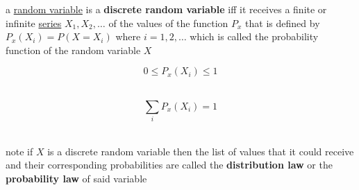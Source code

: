 \documentclass[a4paper,12pt]{article}
\newcommand{\?}{\stackrel{?}{=}}
\begin{document}
\newenvironment{note}
  {\begin{bclogo}[logo=\bcinfo, couleurBarre=orange, couleur=lightgray]{ note}}
  {\end{bclogo}}
\newenvironment{attention}
  {\begin{bclogo}[logo=\bcattention, couleurBarre=red, noborder=true, 
                couleur=red!15]{Important!}}
  {\end{bclogo}}

\begin{definition}
a \href{20230104221353-random_variable.org}{random variable} is a \textbf{discrete random variable} iff it receives a finite or infinite \href{calculus2.org}{series} \(X_1,X_2,\dots\) of the values of the function \(P_x\) that is defined by \(P_x(X_i)=P(X=X_i)\) where \(i=1,2,\dots\) which is called the probability function of the random variable \(X\)\\[0pt]
\end{definition}
\begin{characteristic}
\[
0 \le P_x(X_i) \le 1
\]\\[0pt]
\end{characteristic}
\begin{characteristic}
\[
\sum_{i} P_x(X_i) = 1
\]\\[0pt]
\end{characteristic}
\begin{note}
if \(X\) is a discrete random variable then the list of values that it could receive and their corresponding probabilities are called the \textbf{distribution law} or the \textbf{probability law} of said variable\\[0pt]
\end{note}
\end{document}
